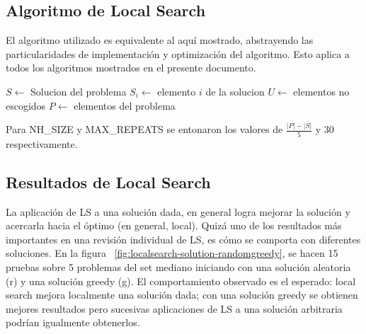 \documentclass{ci5652}
\begin{document}
\subsection{Algoritmo de Local Search}
El algoritmo utilizado es equivalente al aquí mostrado, abstrayendo las particularidades de implementación y optimización del algoritmo. Esto aplica a todos los algoritmos mostrados en el presente documento.

\begin{algorithm}[h!]
\DontPrintSemicolon
$S \leftarrow$ Solucion del problema\;
$S_i \leftarrow$ elemento $i$ de la solucion\;
$U \leftarrow$ elementos no escogidos\;
$P \leftarrow$ elementos del problema\;
\end{algorithm}

Para NH\_SIZE y MAX\_REPEATS se entonaron los valores de $\frac{|P|-|S|}{5}$ y $30$ respectivamente.

\subsection{Resultados de Local Search}
La aplicación de LS a una solución dada, en general logra mejorar la solución y acercarla hacia el óptimo (en general, local). Quizá uno de los resultados más importantes en una revisión individual de LS, es cómo se comporta con diferentes soluciones. En la figura ~\ref{fig:localsearch-solution-randomgreedy}, se hacen 15 pruebas sobre 5 problemas del set mediano iniciando con una solución aleatoria (r) y una solución greedy (g).
El comportamiento observado es el esperado: local search mejora localmente una solución dada; con una solución greedy se obtienen mejores resultados pero sucesivas aplicaciones de LS a una solución arbitraria podrían igualmente obtenerlos.
\end{document}
